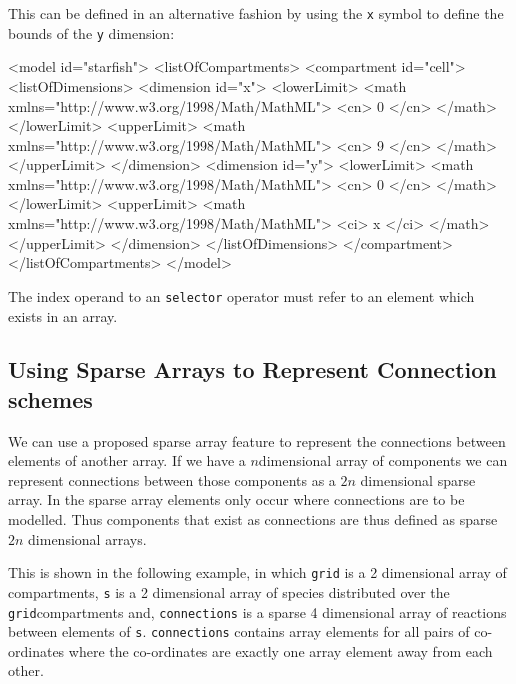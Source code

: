 \documentclass{cekarticle}
\begin{document}
This can be defined in an alternative fashion by using the \texttt{x} symbol to define the bounds of the \texttt{y} dimension:
\begin{example}
<model id="starfish">
    <listOfCompartments>
        <compartment id="cell">
            <listOfDimensions>
                <dimension id="x">
                    <lowerLimit>
                        <math xmlns="http://www.w3.org/1998/Math/MathML">
                            <cn> 0 </cn>
                        </math>
                    </lowerLimit>
                    <upperLimit>
                        <math xmlns="http://www.w3.org/1998/Math/MathML">
                            <cn> 9 </cn>
                        </math>
                    </upperLimit>
                </dimension>
                <dimension id="y">
                    <lowerLimit>
                        <math xmlns="http://www.w3.org/1998/Math/MathML">
                            <cn> 0 </cn>
                        </math>
                    </lowerLimit>
                    <upperLimit>
                        <math xmlns="http://www.w3.org/1998/Math/MathML">
                            <ci> x </ci>
                        </math>
                    </upperLimit>
                </dimension>
            </listOfDimensions>
        </compartment>
    </listOfCompartments>
</model>
\end{example}

The index operand to an \texttt{selector} operator must refer to an element
which exists in an array.  

\subsection{Using Sparse Arrays to Represent Connection schemes}
\label{sec:connections}

We can use a proposed sparse array feature to represent the connections
between elements of another array.  If we have a $n$dimensional array of
components we can represent connections between those components as a $2 n$ dimensional 
sparse array.  In the sparse array elements only occur where connections are to be modelled.
Thus components that exist as connections are thus defined as sparse $2 n$ dimensional arrays.

This is shown in the
following example, in which \texttt{grid} is a 2 dimensional
array of compartments, \texttt{s} is a 2 dimensional array of
species distributed over the \texttt{grid}compartments and, \texttt{connections} is a sparse 4
dimensional array of reactions between elements of \texttt{s}.
\texttt{connections} contains array elements for all
pairs of co-ordinates where the co-ordinates are exactly one array element
away from each other.
\end{document}
